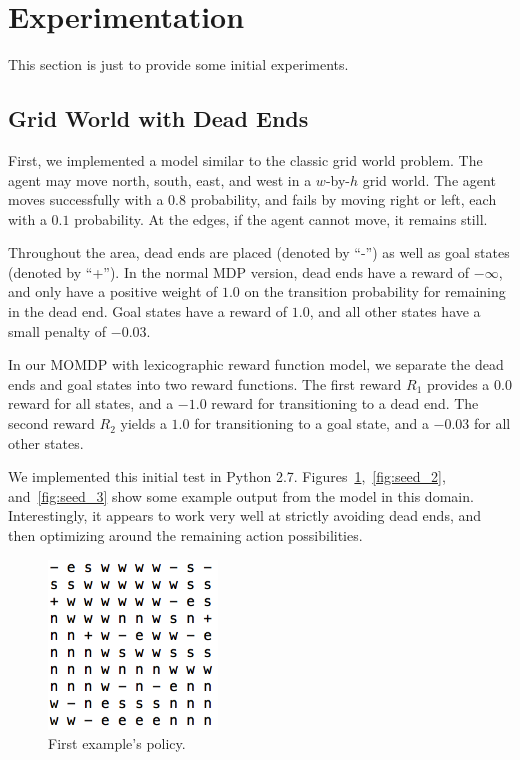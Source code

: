 \section{Experimentation}
\label{sec:experimentation}

This section is just to provide some initial experiments.

\subsection{Grid World with Dead Ends}
First, we implemented a model similar to the classic grid world problem. The agent may move north, south, east, and west in a $w$-by-$h$ grid world. The agent moves successfully with a $0.8$ probability, and fails by moving right or left, each with a $0.1$ probability. At the edges, if the agent cannot move, it remains still.

Throughout the area, dead ends are placed (denoted by ``-'') as well as goal states (denoted by ``+''). In the normal MDP version, dead ends have a reward of $-\infty$, and only have a positive weight of $1.0$ on the transition probability for remaining in the dead end. Goal states have a reward of $1.0$, and all other states have a small penalty of $-0.03$.

In our MOMDP with lexicographic reward function model, we separate the dead ends and goal states into two reward functions. The first reward $R_1$ provides a $0.0$ reward for all states, and a $-1.0$ reward for transitioning to a dead end. The second reward $R_2$ yields a $1.0$ for transitioning to a goal state, and a $-0.03$ for all other states.

We implemented this initial test in Python 2.7. Figures~\ref{fig:seed_1},~\ref{fig:seed_2}, and~\ref{fig:seed_3} show some example output from the model in this domain. Interestingly, it appears to work very well at strictly avoiding dead ends, and then optimizing around the remaining action possibilities.
\begin{figure}[h]
    \centering
    \includegraphics[width=0.4\textwidth,bb=0 0 279 280]{seed_1.png}
    \caption{First example's policy.}
    \label{fig:seed_1}
\end{figure}


